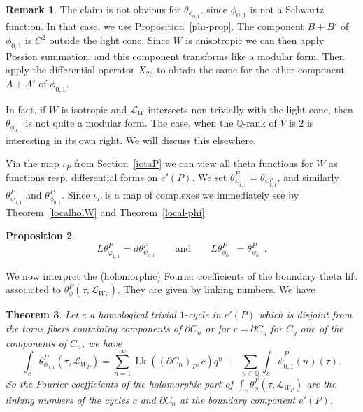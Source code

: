 \documentclass[12pt,leqno]{amsart}
\numberwithin{equation}{section}
\theoremstyle{plain}
\newtheorem{theorem}{Theorem}[section]
\newtheorem{proposition}[theorem]{Proposition}
\theoremstyle{definition}
\newtheorem{remark}[theorem]{Remark}
\theoremstyle{remark}
\newcommand{\Q}{\mathbb{Q}}
\newcommand{\calL}{\mathcal{L}}
\newcommand{\Lk}{\operatorname{Lk}}
\begin{document}
\begin{remark}
The claim is not obvious for $\theta_{\phi_{0,1}}$, since $\phi_{0,1}$ is not a Schwartz function. In that case, we use Proposition~\ref{phi-prop}. The component $B+B'$ of $\phi_{0,1}$ is $C^2$ outside the light cone. Since $W$ is anisotropic we can then apply Possion summation, and this component transforms like a modular form. Then apply the differential operator $X_{23}$ to obtain the same for the other component $A+A'$ of $\phi_{0,1}$. 
 
 In fact, if $W$ is isotropic and $\calL_W$ intersects non-trivially with the light cone, then $\theta_{\phi_{0,1}}$ is not quite a modular form. The case, when the $\Q$-rank of $V$ is $2$ is interesting in its own right. We will discuss this elsewhere. 
\end{remark}






Via the map $\iota_P$ from Section~\ref{iotaP} we can view all theta functions for $W$ as functions resp. differential forms on $e'(P)$. We set $
\theta^P_{\varphi_{1,1}} =   \theta_{\varphi_{1,1}^P}$, 
and similarly $\theta^P_{\psi_{0,1}}$ and $\theta^P_{\phi_{0,1}}$. Since $\iota_P$ is a map of complexes we immediately see by Theorem~\ref{localholW} and Theorem~\ref{local-phi}

\begin{proposition}\label{globalholomorphic2}
\[
L \theta^P_{\varphi_{1,1}} = d\theta^P_{\psi_{0,1}} \qquad \text{and} \qquad 
L \theta^P_{\phi_{0,1}} = \theta^P_{\psi_{0,1}}.
\]
\end{proposition}

We now interpret the (holomorphic) Fourier coefficients of the boundary theta lift associated to $ \theta^P_{\phi}(\tau,\calL_{W_P})$. They are given by linking numbers. We have


\begin{theorem}\label{xi'-integralP}
Let $c$ a homological trivial $1$-cycle in $e'(P)$ which
is disjoint from the torus fibers containing components of $\partial C_n$ or for $c=\partial C_y$ for $C_y$ one of the components of $C_n$, we have
\[
\int_{c} \theta^P_{\phi_{0,1}}(\tau,\calL_{W_P}) = 
  \sum_{n=1}^{\infty}  \Lk((\partial C_n)_P,c) q^n
 \; + \; \sum_{n \in \Q} \int_{c}  {\tilde{\psi}_{0,1}^P}(n)(\tau).
\]
 So the Fourier coefficients of the holomorphic part of $\int_{c} \theta^P_{\phi}(\tau,\calL_{W_P})$ are the linking numbers of the cycles $c$ and $ \partial C_n$ at the boundary component $e'(P)$.  
 \end{theorem}
\end{document}
